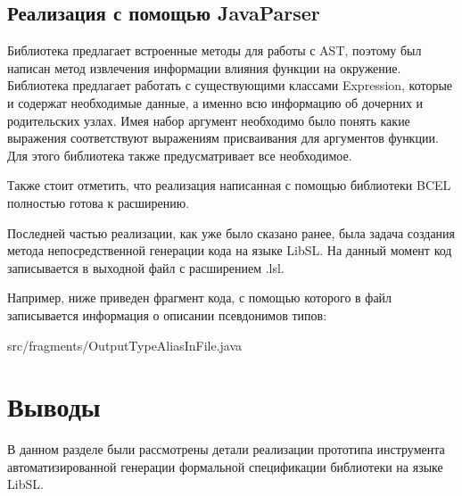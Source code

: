 \subsection{Реализация с помощью JavaParser}

Библиотека предлагает встроенные методы для работы с AST, поэтому был написан метод извлечения информации влияния функции на окружение.
Библиотека предлагает работать с существующими классами Expression, которые и содержат необходимые данные, а именно всю информацию об дочерних и родительских узлах. Имея набор аргумент необходимо было понять какие выражения соответствуют выражениям присваивания для аргументов функции.
Для этого библиотека также предусматривает все необходимое.

Также стоит отметить, что реализация написанная с помощью библиотеки BCEL полностью готова к расширению.

Последней частью реализации, как уже было сказано ранее, была задача создания метода непосредственной генерации кода на языке LibSL.
На данный момент код записывается в выходной файл с расширением .lsl.

Например, ниже приведен фрагмент кода, с помощью которого в файл записывается информация о описании псевдонимов типов:

{src/fragments/OutputTypeAliasInFile.java}

\section{Выводы}

В данном разделе были рассмотрены детали реализации прототипа инструмента автоматизированной генерации формальной спецификации библиотеки на языке LibSL.